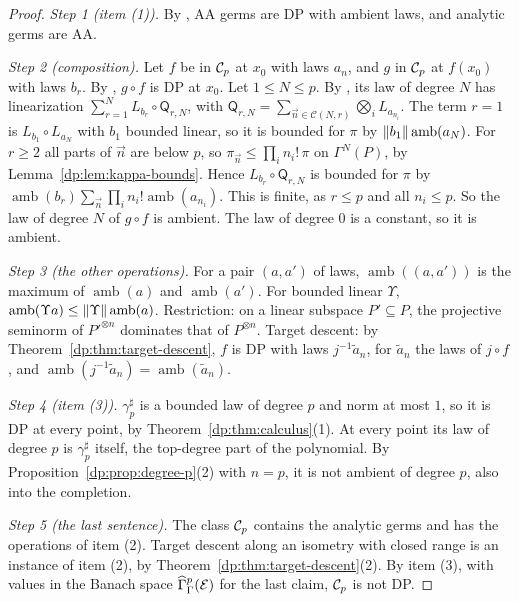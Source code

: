 \begin{proof}
\emph{Step 1 (item (1)).} By \cite[Proposition~14.9(1)]{I}, AA germs are DP with ambient laws, and analytic germs are AA.

\emph{Step 2 (composition).} Let $f$ be in $\mathcal{C}_p$ at $x_0$ with laws $a_n$, and $g$ in $\mathcal{C}_p$ at $f(x_0)$ with laws $b_r$. By \cite[Lemma~Q.3]{I}, $g\circ f$ is DP at $x_0$. Let $1\le N\le p$. By \cite[Lemma~Q.4]{I}, its law of degree $N$ has linearization $\sum_{r=1}^NL_{b_r}\circ\mathsf Q_{r,N}$, with $\mathsf Q_{r,N}=\sum_{\vec n\in\mathcal C(N,r)}\bigotimes_iL_{a_{n_i}}$. The term $r=1$ is $L_{b_1}\circ L_{a_N}$ with $b_1$ bounded linear, so it is bounded for $\pi$ by $\lVert b_1\rVert\operatorname{amb}(a_N)$. For $r\ge2$ all parts of $\vec n$ are below $p$, so $\pi_{\vec n}\le\prod_in_i!\,\pi$ on $\Gamma^N(P)$, by Lemma~\ref{dp:lem:kappa-bounds}. Hence $L_{b_r}\circ\mathsf Q_{r,N}$ is bounded for $\pi$ by $\operatorname{amb}(b_r)\sum_{\vec n}\prod_in_i!\operatorname{amb}(a_{n_i})$. This is finite, as $r\le p$ and all $n_i\le p$. So the law of degree $N$ of $g\circ f$ is ambient. The law of degree $0$ is a constant, so it is ambient.

\emph{Step 3 (the other operations).} For a pair $(a,a')$ of laws, $\operatorname{amb}((a,a'))$ is the maximum of $\operatorname{amb}(a)$ and $\operatorname{amb}(a')$. For bounded linear $\Upsilon$, $\operatorname{amb}(\Upsilon a)\le\lVert \Upsilon\rVert\operatorname{amb}(a)$. Restriction: on a linear subspace $P'\subseteq P$, the projective seminorm of $P'^{\otimes n}$ dominates that of $P^{\otimes n}$. Target descent: by Theorem~\ref{dp:thm:target-descent}, $f$ is DP with laws $j^{-1}\tilde a_n$, for $\tilde a_n$ the laws of $j\circ f$, and $\operatorname{amb}(j^{-1}\tilde a_n)=\operatorname{amb}(\tilde a_n)$.

\emph{Step 4 (item (3)).} $\gamma^\sharp_p$ is a bounded law of degree $p$ and norm at most $1$, so it is DP at every point, by Theorem~\ref{dp:thm:calculus}(1). At every point its law of degree $p$ is $\gamma^\sharp_p$ itself, the top-degree part of the polynomial. By Proposition~\ref{dp:prop:degree-p}(2) with $n=p$, it is not ambient of degree $p$, also into the completion.

\emph{Step 5 (the last sentence).} The class $\mathcal{C}_p$ contains the analytic germs and has the operations of item (2). Target descent along an isometry with closed range is an instance of item (2), by Theorem~\ref{dp:thm:target-descent}(2). By item (3), with values in the Banach space $\widehat\Gamma^p_\Gamma(\mathcal E)$ for the last claim, $\mathcal{C}_p$ is not DP.
\end{proof}


